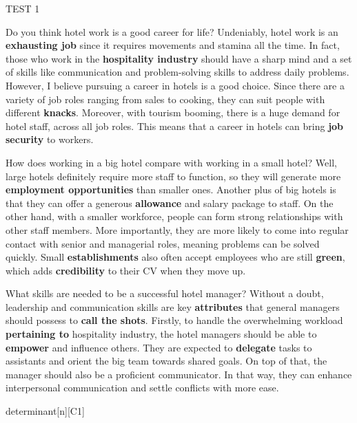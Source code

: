 \begin{glossarymc}[Cambridge 15]
\begin{test}{TEST 1}
    \begin{qa}{Do you think hotel work is a good career for life?}
    Undeniably, hotel work is an \textbf{exhausting job} since it requires movements and stamina all the time. In fact, those who work in the \textbf{hospitality industry} should have a sharp mind and a set of skills like communication and problem-solving skills to address daily problems. However, I believe pursuing a career in hotels is a good choice. Since there are a variety of job roles ranging from sales to cooking, they can suit people with different \textbf{knacks}. Moreover, with tourism booming, there is a huge demand for hotel staff, across all job roles. This means that a career in hotels can bring \textbf{job security} to workers.
    \end{qa}

    \begin{qa}{How does working in a big hotel compare with working in a small hotel?}
    Well, large hotels definitely require more staff to function, so they will generate more \textbf{employment opportunities} than smaller ones. Another plus of big hotels is that they can offer a generous \textbf{allowance} and salary package to staff. On the other hand, with a smaller workforce, people can form strong relationships with other staff members. More importantly, they are more likely to come into regular contact with senior and managerial roles, meaning problems can be solved quickly. Small \textbf{establishments} also often accept employees who are still \textbf{green}, which adds \textbf{credibility} to their CV when they move up.
    \end{qa}

    \begin{qa}{What skills are needed to be a successful hotel manager?}
    Without a doubt, leadership and communication skills are key \textbf{attributes} that general managers should possess to \textbf{call the shots}. Firstly, to handle the overwhelming workload \textbf{pertaining to} hospitality industry, the hotel managers should be able to \textbf{empower} and influence others. They are expected to \textbf{delegate} tasks to assistants and orient the big team towards shared goals. On top of that, the manager should also be a proficient communicator. In that way, they can enhance interpersonal communication and settle conflicts with more ease.
    \end{qa}

        \begin{VocabExplain}[Part 3]
            \begin{ExplainCard}{determinant}[n][C1]
            \end{ExplainCard}


\end{VocabExplain}
\end{test}
\end{glossarymc}
